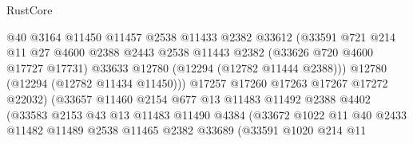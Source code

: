 \begin{lexlean}{RustCore}
\begin{coremodule}
                                  @40
                                  @3164
                                  @11450
                                  @11457
                                  @2538
                                  @11433
                                  @2382
                                  @33612
                                  (@33591
                                    @721
                                    @214
                                    @11
                                    @27
                                    @4600
                                    @2388
                                    @2443
                                    @2538
                                    @11443
                                    @2382
                                    (@33626 @720 @4600 @17727 @17731)
                                    @33633
                                    @12780
                                    (@12294 (@12782 @11444 @2388)))
                                  @12780
                                  (@12294 (@12782 @11434 @11450)))
                                @17257
                                @17260
                                @17263
                                @17267
                                @17272
                                @22032)
                              (@33657
                                @11460
                                @2154
                                @677
                                @13
                                @11483
                                @11492
                                @2388
                                @4402
                                (@33583
                                  @2153
                                  @43
                                  @13
                                  @11483
                                  @11490
                                  @4384
                                  (@33672
                                    @1022
                                    @11
                                    @40
                                    @2433
                                    @11482
                                    @11489
                                    @2538
                                    @11465
                                    @2382
                                    @33689
                                    (@33591
                                      @1020
                                      @214
                                      @11

\end{coremodule}
\end{lexlean}
